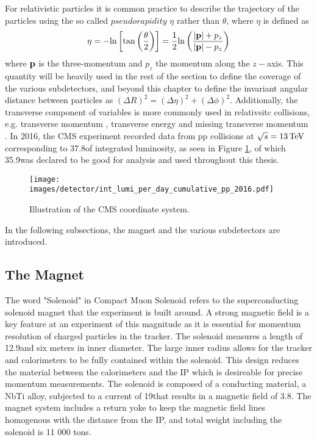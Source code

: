 For relativistic particles it is common practice to describe the trajectory of the particles using the so called $pseudorapidity$ $\eta$ rather than $\theta$, where $\eta$ is defined as
\begin{equation}
\eta=-\mathrm{ln}\left[\mathrm{tan}\left(\frac{\theta}{2}\right)\right]=\frac{1}{2}\mathrm{ln}\left(\frac{|\bold{p}|+p_{z}}{|\bold{p}|-p_{z}}\right)
\end{equation}
where $\bold{p}$ is the three-momentum and $p_{z}$ the momentum along the $z-$axis. 
This quantity will be heavily used in the rest of the section to define the coverage of the various subdetectors, and beyond this chapter to define the invariant angular distance between particles as $(\Delta R)^{2}=(\Delta \eta)^{2}+(\Delta \phi)^{2}$. 
Additionally, the transverse component of variables is more commonly used in relativsitc collisions, e.g. transverse momentum \pt, transverse energy \ET and missing transverse momentum \ptmiss.
In 2016, the CMS experiment recorded data from pp collisions at $\sqrt{s}=13\,\text{Te\hspace{-.08em}V}$ corresponding to 37.8\fbinv of integrated luminosity, as seen in Figure \ref{fig:lumi}, of which 35.9\fbinv was declared to be good for analysis and used throughout this thesis. 
\begin{figure}[!htp]
  \centering
   \texttt{[image: images/detector/int\_lumi\_per\_day\_cumulative\_pp\_2016.pdf]}
   \caption{Illustration of the CMS coordinate system.\cite{lumi}}
   \label{fig:lumi}
\end{figure}                                                                               

In the following subsections, the magnet and the various subdetectors are introduced. 
\subsection{The Magnet}
The word "Solenoid" in Compact Muon Solenoid refers to the superconducting solenoid magnet that the experiment is built around. 
A strong magnetic field is a key feature at an experiment of this magnitude as it is essential for momentum resolution of charged particles in the tracker. 
The solenoid measures a length of 12.9\m and six meters in inner diameter. 
The large inner radius allows for the tracker and calorimeters to be fully contained within the solenoid. 
This design reduces the material between the calorimeters and the IP which is desireable for precise momentum measurements. 
The solenoid is composed of a conducting material, a NbTi alloy, subjected to a current of 19\kA that results in a magnetic field of 3.8\T. 
The magnet system includes a return yoke to keep the magnetic field lines homogenous with the distance from the IP, and total weight including the solenoid is 11 000 tons.  
\cite{CERN-LHCC-97-010}
